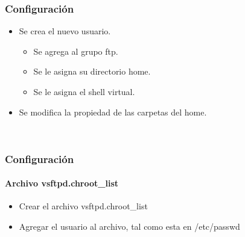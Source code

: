    \begin{frame}
     \frametitle{Configuraci\'on}
    \begin{itemize}
      \item Se crea el nuevo usuario.
      \begin{itemize}
        \item Se agrega al grupo ftp.
        \item Se le asigna su directorio home.
        \item Se le asigna el shell virtual.
      \end{itemize}
      \item Se modifica la propiedad de las carpetas del home.
    \end{itemize}
    
    \begin{shell}
      \\
    \hline\end{shell}
   \end{frame}

   \begin{frame}
     \frametitle{Configuraci\'on}
     \framesubtitle{Archivo vsftpd.chroot\_list}
     \begin{itemize}
       \item Crear el archivo vsftpd.chroot\_list
       \item Agregar el usuario al archivo, tal como esta en /etc/passwd
     \end{itemize}
    \begin{shell}
    \hline\end{shell}
   \end{frame}
